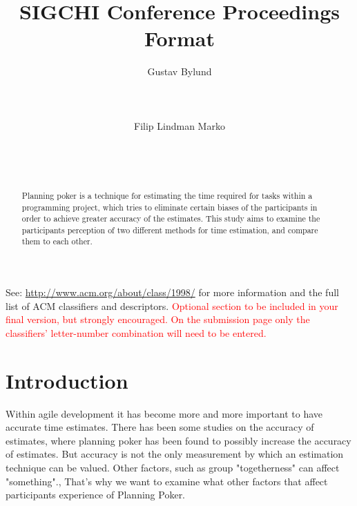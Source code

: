\documentclass{sigchi}
\begin{document}
\title{SIGCHI Conference Proceedings Format}

\author{
  \alignauthor Gustav Bylund\\
    \\
    \\
    \\
  \alignauthor Filip Lindman Marko\\
    \\
    \\
    \\
}

\maketitle

\begin{abstract}
Planning poker is a technique for estimating the time required for tasks
within a programming project, which tries to eliminate certain biases of
the participants in order to achieve greater accuracy of the estimates. \cite{grenning2002planning}
This study aims to examine the participants perception of two different
methods for time estimation, and compare them to each other.
\end{abstract}



See: \url{http://www.acm.org/about/class/1998/}
for more information and the full list of ACM classifiers
and descriptors. \newline
\textcolor{red}{Optional section to be included in your final version,
but strongly encouraged. On the submission page only the classifiers’
letter-number combination will need to be entered.}

\section{Introduction}
Within agile development it has become more and more important to have accurate time estimates. There has been some studies on the accuracy of estimates, where planning poker has been found to possibly increase the accuracy of estimates. \cite{molokken2007combining}
But accuracy is not the only measurement by which an estimation technique can be valued. Other factors, such as group "togetherness" can affect "something".\cite{wellington2005examining}, That's why we want to examine what other factors that affect participants experience of Planning Poker.
\end{document}
